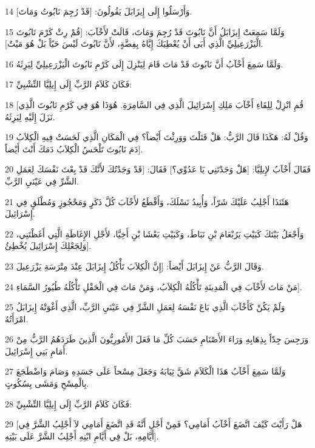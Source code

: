 \par 14 وَأَرْسَلُوا إِلَى إِيزَابَلَ يَقُولُونَ: [قَدْ رُجِمَ نَابُوتُ وَمَاتَ].
\par 15 وَلَمَّا سَمِعَتْ إِيزَابَلُ أَنَّ نَابُوتَ قَدْ رُجِمَ وَمَاتَ، قَالَتْ لأَخْآبَ: [قُمْ رِثْ كَرْمَ نَابُوتَ الْيَزْرَعِيلِيِّ الَّذِي أَبَى أَنْ يُعْطِيَكَ إِيَّاهُ بِفِضَّةٍ، لأَنَّ نَابُوتَ لَيْسَ حَيّاً بَلْ هُوَ مَيْتٌ].
\par 16 وَلَمَّا سَمِعَ أَخْآبُ أَنَّ نَابُوتَ قَدْ مَاتَ قَامَ لِيَنْزِلَ إِلَى كَرْمِ نَابُوتَ الْيَزْرَعِيلِيِّ لِيَرِثَهُ.
\par 17 فَكَانَ كَلاَمُ الرَّبِّ إِلَى إِيلِيَّا التِّشْبِيِّ:
\par 18 [قُمِ انْزِلْ لِلِقَاءِ أَخْآبَ مَلِكِ إِسْرَائِيلَ الَّذِي فِي السَّامِرَةِ. هُوَذَا هُوَ فِي كَرْمِ نَابُوتَ الَّذِي نَزَلَ إِلَيْهِ لِيَرِثَهُ.
\par 19 وَقُلْ لَهُ: هَكَذَا قَالَ الرَّبُّ: هَلْ قَتَلْتَ وَوَرِثْتَ أَيْضاً؟ فِي الْمَكَانِ الَّذِي لَحَسَتْ فِيهِ الْكِلاَبُ دَمَ نَابُوتَ تَلْحَسُ الْكِلاَبُ دَمَكَ أَنْتَ أَيْضاً].
\par 20 فَقَالَ أَخْآبُ لإِيلِيَّا: [هَلْ وَجَدْتَنِي يَا عَدُوِّي؟] فَقَالَ: [قَدْ وَجَدْتُكَ لأَنَّكَ قَدْ بِعْتَ نَفْسَكَ لِعَمَلِ الشَّرِّ فِي عَيْنَيِ الرَّبِّ.
\par 21 هَئَنَذَا أَجْلِبُ عَلَيْكَ شَرّاً، وَأُبِيدُ نَسْلَكَ، وَأَقْطَعُ لأَخْآبَ كُلَّ ذَكَرٍ وَمَحْجُوزٍ وَمُطْلَقٍ فِي إِسْرَائِيلَ.
\par 22 وَأَجْعَلُ بَيْتَكَ كَبَيْتِ يَرُبْعَامَ بْنِ نَبَاطَ، وَكَبَيْتِ بَعْشَا بْنِ أَخِيَّا، لأَجْلِ الإِغَاظَةِ الَّتِي أَغَظْتَنِي، وَلِجَعْلِكَ إِسْرَائِيلَ يُخْطِئُ].
\par 23 وَقَالَ الرَّبُّ عَنْ إِيزَابَلَ أَيْضاً: [إِنَّ الْكِلاَبَ تَأْكُلُ إِيزَابَلَ عِنْدَ مِتْرَسَةِ يَزْرَعِيلَ.
\par 24 مَنْ مَاتَ لأَخْآبَ فِي الْمَدِينَةِ تَأْكُلُهُ الْكِلاَبُ، وَمَنْ مَاتَ فِي الْحَقْلِ تَأْكُلُهُ طُيُورُ السَّمَاءِ].
\par 25 وَلَمْ يَكُنْ كَأَخْآبَ الَّذِي بَاعَ نَفْسَهُ لِعَمَلِ الشَّرِّ فِي عَيْنَيِ الرَّبِّ، الَّذِي أَغْوَتْهُ إِيزَابَلُ امْرَأَتُهُ.
\par 26 وَرَجِسَ جِدّاً بِذِهَابِهِ وَرَاءَ الأَصْنَامِ حَسَبَ كُلِّ مَا فَعَلَ الأَمُورِيُّونَ الَّذِينَ طَرَدَهُمُ الرَّبُّ مِنْ أَمَامِ بَنِي إِسْرَائِيلَ.
\par 27 وَلَمَّا سَمِعَ أَخْآبُ هَذَا الْكَلاَمَ شَقَّ ثِيَابَهُ وَجَعَلَ مِسْحاً عَلَى جَسَدِهِ وَصَامَ وَاضْطَجَعَ بِالْمِسْحِ وَمَشَى بِسُكُوتٍ.
\par 28 فَكَانَ كَلاَمُ الرَّبِّ إِلَى إِيلِيَّا التِّشْبِيِّ:
\par 29 [هَلْ رَأَيْتَ كَيْفَ اتَّضَعَ أَخْآبُ أَمَامِي؟ فَمِنْ أَجْلِ أَنَّهُ قَدِ اتَّضَعَ أَمَامِي لاَ أَجْلِبُ الشَّرَّ فِي أَيَّامِهِ، بَلْ فِي أَيَّامِ ابْنِهِ أَجْلِبُ الشَّرَّ عَلَى بَيْتِهِ].

